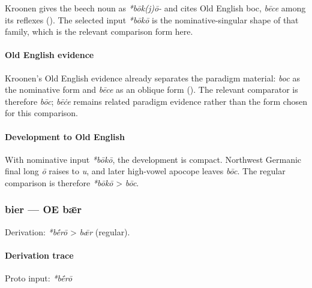 \documentclass[
  british,
  a4paper,
]{article}
\begin{document}
Kroonen gives the beech noun as \emph{*bōk(j)ō-} and cites Old English
boc, \emph{bēce} among its reflexes (). The selected input \emph{*bōkō} is the nominative-singular shape
of that family, which is the relevant comparison form here.

\paragraph{Old English evidence}\label{old-english-evidence-1}

Kroonen's Old English evidence already separates the paradigm material:
\emph{boc} as the nominative form and \emph{bēce} as an oblique form
(). The relevant comparator is
therefore \emph{bōc}; \emph{bēċe} remains related paradigm evidence
rather than the form chosen for this comparison.

\paragraph{Development to Old
English}\label{development-to-old-english-1}

With nominative input \emph{*bōkō}, the development is compact.
Northwest Germanic final long \emph{ō} raises to \emph{u}, and later
high-vowel apocope leaves \emph{bōc}. The regular comparison is
therefore \emph{*bōkō} \textgreater{} \emph{bōc}.

\subsubsection{bier --- OE bǣr}\label{bier-oe-bux1e3r}

Derivation: \emph{*bḗrō} \textgreater{} \emph{bǣr} (regular).

\paragraph{Derivation trace}\label{derivation-trace-2}

Proto input: \emph{*bḗrō}

\begingroup
\setlength{\fboxsep}{6pt}
\end{document}
